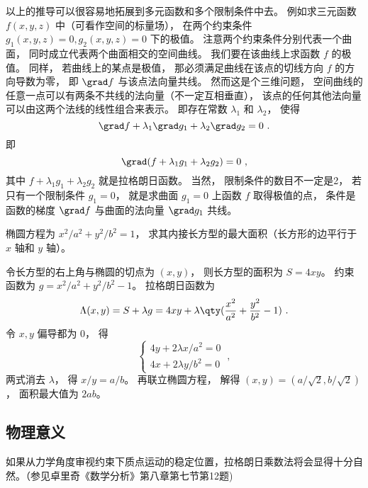 以上的推导可以很容易地拓展到多元函数和多个限制条件中去。 例如求三元函数 $f(x,y,z)$ 中（可看作空间的标量场）， 在两个约束条件 $g_1(x,y,z) = 0, g_2(x,y,z) = 0$ 下的极值。 注意两个约束条件分别代表一个曲面， 同时成立代表两个曲面相交的空间曲线。 我们要在该曲线上求函数 $f$ 的极值。 同样， 若曲线上的某点是极值， 那必须满足曲线在该点的切线方向 $f$ 的方向导数为零， 即 $\grad f$ 与该点法向量共线。 然而这是个三维问题， 空间曲线的任意一点可以有两条不共线的法向量（不一定互相垂直）， 该点的任何其他法向量可以由这两个法线的线性组合来表示。 即存在常数 $\lambda_1$ 和 $\lambda_2$， 使得
\begin{equation}
\grad f + \lambda_1 \grad g_1 + \lambda_2 \grad g_2 = 0~.
\end{equation}
即
\begin{equation}
\grad (f + \lambda_1 g_1 + \lambda_2 g_2) = 0~,
\end{equation}
其中 $f + \lambda_1 g_1 + \lambda_2 g_2$ 就是拉格朗日函数。 当然， 限制条件的数目不一定是2， 若只有一个限制条件 $g_1 = 0$， 就是求曲面 $g_1 = 0$ 上函数 $f$ 取得极值的点， 条件是函数的梯度 $\grad f$ 与曲面的法向量 $\grad g_1$ 共线。

\begin{example}{}
椭圆方程为 $x^2/a^2 + y^2/b^2 = 1$， 求其内接长方型的最大面积（长方形的边平行于 $x$ 轴和 $y$ 轴）。

令长方型的右上角与椭圆的切点为 $(x,y)$， 则长方型的面积为 $S = 4xy$。 约束函数为 $g = x^2/a^2 + y^2/b^2 - 1$。 拉格朗日函数为
\begin{equation}
\Lambda(x,y) = S + \lambda g = 4xy + \lambda \qty(\frac{x^2}{a^2} + \frac{y^2}{b^2} - 1)~.
\end{equation}
令 $x, y$ 偏导都为 0， 得
\begin{equation}
\begin{cases}
4y + 2\lambda x/a^2 = 0\\
4x + 2\lambda y/b^2 = 0
\end{cases}~,
\end{equation}
两式消去 $\lambda$， 得 $x/y = a/b$。 再联立椭圆方程， 解得 $(x,y) = (a/\sqrt{2}, b/\sqrt{2})$， 面积最大值为 $2ab$。
\end{example}

\subsection{物理意义}
如果从力学角度审视约束下质点运动的稳定位置，拉格朗日乘数法将会显得十分自然。（参见卓里奇《数学分析》第八章第七节第12题)

